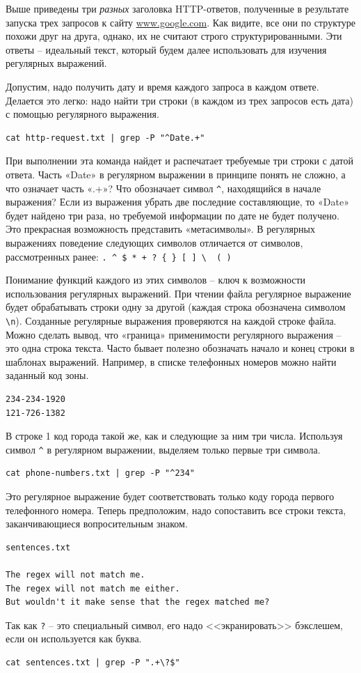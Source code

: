\documentclass[a4paper,12pt,final,openany]{extbook}
\begin{document}
Выше приведены три \emph{разных} заголовка HTTP-ответов, полученные в результате запуска трех запросов к сайту
\href{http://www.google.com}{www.google.com}. Как видите, все они по
структуре похожи друг на друга, однако, их не считают
строго структурированными. Эти ответы -- идеальный текст, который будем
далее использовать для изучения регулярных выражений.

Допустим, надо
получить дату и время каждого запроса в каждом ответе. Делается это
легко: надо найти три строки (в каждом из трех запросов есть дата) с
помощью регулярного выражения.
\begin{verbatim}
cat http-request.txt | grep -P "^Date.+"
\end{verbatim}

При выполнении эта команда найдет и распечатает требуемые три строки с
датой ответа. Часть «Date» в регулярном выражении в принципе понять
не сложно, а что означает часть «.+»? Что обозначает символ
\texttt{\^{}}, находящийся в начале выражения? Если из выражения убрать
две последние составляющие, то «Date» будет найдено три раза, но
требуемой информации по дате не будет получено. Это прекрасная
возможность представить «метасимволы». В регулярных выражениях поведение
следующих символов отличается от символов, рассмотренных ранее:
\texttt{.\ \^{}\ \$\ *\ +\ ?\ \{\ \}\ {[}\ {]}\ \textbackslash{}\ \textbar{}\ (\ )}

Понимание функций каждого из этих символов -- ключ к возможности
использования регулярных выражений. При чтении файла регулярное
выражение будет обрабатывать строки одну за другой (каждая строка
обозначена символом \texttt{\textbackslash{}n}). Созданные регулярные
выражения проверяются на каждой строке файла. Можно сделать вывод, что
«граница» применимости регулярного выражения -- это одна строка текста.
Часто бывает полезно обозначать начало и конец строки в шаблонах
выражений. Например, в списке телефонных номеров можно найти заданный
код зоны.
\begin{verbatim}
234-234-1920
121-726-1382
\end{verbatim}
В строке 1 код города такой же, как и следующие за ним три числа.
Используя символ \texttt{\^{}} в регулярном выражении, выделяем только
первые три символа.
\begin{verbatim}
cat phone-numbers.txt | grep -P "^234"
\end{verbatim}
Это регулярное выражение будет соответствовать только коду города
первого телефонного номера. Теперь предположим, надо сопоставить все
строки текста, заканчивающиеся вопросительным знаком.
\begin{verbatim}
sentences.txt

The regex will not match me.
The regex will not match me either.
But wouldn't it make sense that the regex matched me?
\end{verbatim}
Так как \texttt{?} -- это специальный символ, его надо <<экранировать>> бэкслешем, если он используется как буква.
\begin{verbatim}
cat sentences.txt | grep -P ".+\?$"
\end{verbatim}
\end{document}
